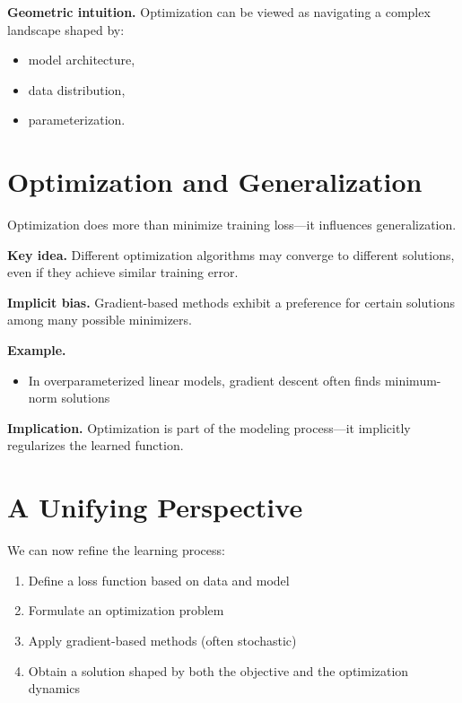 \noindent
\textbf{Geometric intuition.}  
Optimization can be viewed as navigating a complex landscape shaped by:
\begin{itemize}
    \item model architecture,
    \item data distribution,
    \item parameterization.
\end{itemize}

\section{Optimization and Generalization}

Optimization does more than minimize training loss—it influences generalization.

\medskip

\noindent
\textbf{Key idea.}  
Different optimization algorithms may converge to different solutions, even if they achieve similar training error.

\medskip

\noindent
\textbf{Implicit bias.}  
Gradient-based methods exhibit a preference for certain solutions among many possible minimizers.

\medskip

\noindent
\textbf{Example.}
\begin{itemize}
    \item In overparameterized linear models, gradient descent often finds minimum-norm solutions
\end{itemize}

\medskip

\noindent
\textbf{Implication.}  
Optimization is part of the modeling process—it implicitly regularizes the learned function.

\section{A Unifying Perspective}

We can now refine the learning process:

\begin{enumerate}
    \item Define a loss function based on data and model
    \item Formulate an optimization problem
    \item Apply gradient-based methods (often stochastic)
    \item Obtain a solution shaped by both the objective and the optimization dynamics
\end{enumerate}

